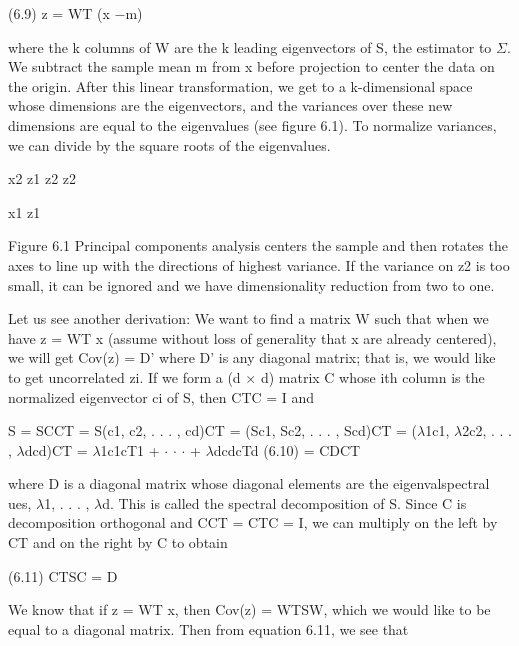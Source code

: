 (6.9) z = WT (x $-$m)

where the k columns of W are the k leading eigenvectors of S, the estimator to $\Sigma$. We subtract the sample mean m from x before projection to center the data on the origin. After this linear transformation, we get to a k-dimensional space whose dimensions are the eigenvectors, and the variances over these new dimensions are equal to the eigenvalues (see figure 6.1). To normalize variances, we can divide by the square roots of the eigenvalues.

x2 z1 z2 z2

x1 z1

Figure 6.1 Principal components analysis centers the sample and then rotates the axes to line up with the directions of highest variance. If the variance on z2 is too small, it can be ignored and we have dimensionality reduction from two to one.

Let us see another derivation: We want to find a matrix W such that when we have z = WT x (assume without loss of generality that x are already centered), we will get Cov(z) = D' where D' is any diagonal matrix; that is, we would like to get uncorrelated zi. If we form a (d $\times$ d) matrix C whose ith column is the normalized eigenvector ci of S, then CTC = I and

S = SCCT = S(c1, c2, . . . , cd)CT = (Sc1, Sc2, . . . , Scd)CT = ($\lambda$1c1, $\lambda$2c2, . . . , $\lambda$dcd)CT = $\lambda$1c1cT1 + $\cdot$ $\cdot$ $\cdot$ + $\lambda$dcdcTd (6.10) = CDCT

where D is a diagonal matrix whose diagonal elements are the eigenvalspectral ues, $\lambda$1, . . . , $\lambda$d. This is called the spectral decomposition of S. Since C is decomposition orthogonal and CCT = CTC = I, we can multiply on the left by CT and on the right by C to obtain

(6.11) CTSC = D

We know that if z = WT x, then Cov(z) = WTSW, which we would like to be equal to a diagonal matrix. Then from equation 6.11, we see that

